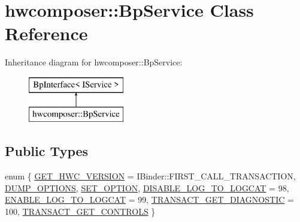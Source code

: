 \hypertarget{classhwcomposer_1_1BpService}{}\section{hwcomposer\+:\+:Bp\+Service Class Reference}
\label{classhwcomposer_1_1BpService}
Inheritance diagram for hwcomposer\+:\+:Bp\+Service\+:\begin{figure}[H]
\begin{center}
\leavevmode
\includegraphics[height=2.000000cm]{classhwcomposer_1_1BpService}
\end{center}
\end{figure}
\subsection*{Public Types}
\begin{DoxyCompactItemize}
\item 
enum \{ \newline
\mbox{\hyperlink{classhwcomposer_1_1BpService_a688b4b1338923222d225a99d16e22319ac29d8afa3ded86d47e7879f814b61f0d}{G\+E\+T\+\_\+\+H\+W\+C\+\_\+\+V\+E\+R\+S\+I\+ON}} = I\+Binder\+:\+:F\+I\+R\+S\+T\+\_\+\+C\+A\+L\+L\+\_\+\+T\+R\+A\+N\+S\+A\+C\+T\+I\+ON, 
\mbox{\hyperlink{classhwcomposer_1_1BpService_a688b4b1338923222d225a99d16e22319a117fba2a971fa7318d8ef74f7a84105c}{D\+U\+M\+P\+\_\+\+O\+P\+T\+I\+O\+NS}}, 
\mbox{\hyperlink{classhwcomposer_1_1BpService_a688b4b1338923222d225a99d16e22319a8f322cc1308b770e9cd5056d9dfefaf3}{S\+E\+T\+\_\+\+O\+P\+T\+I\+ON}}, 
\mbox{\hyperlink{classhwcomposer_1_1BpService_a688b4b1338923222d225a99d16e22319aa6f70e3efcf110f66a046bf4d49ee999}{D\+I\+S\+A\+B\+L\+E\+\_\+\+L\+O\+G\+\_\+\+T\+O\+\_\+\+L\+O\+G\+C\+AT}} = 98, 
\newline
\mbox{\hyperlink{classhwcomposer_1_1BpService_a688b4b1338923222d225a99d16e22319a8ec23523cde1ace78656435c40d75ca6}{E\+N\+A\+B\+L\+E\+\_\+\+L\+O\+G\+\_\+\+T\+O\+\_\+\+L\+O\+G\+C\+AT}} = 99, 
\mbox{\hyperlink{classhwcomposer_1_1BpService_a688b4b1338923222d225a99d16e22319aba1101f98d0ae4dba7ae06b05fa7ecf6}{T\+R\+A\+N\+S\+A\+C\+T\+\_\+\+G\+E\+T\+\_\+\+D\+I\+A\+G\+N\+O\+S\+T\+IC}} = 100, 
\mbox{\hyperlink{classhwcomposer_1_1BpService_a688b4b1338923222d225a99d16e22319a88c048d451c725f7549727f0eb25bd11}{T\+R\+A\+N\+S\+A\+C\+T\+\_\+\+G\+E\+T\+\_\+\+C\+O\+N\+T\+R\+O\+LS}}
 \}
\end{DoxyCompactItemize}
